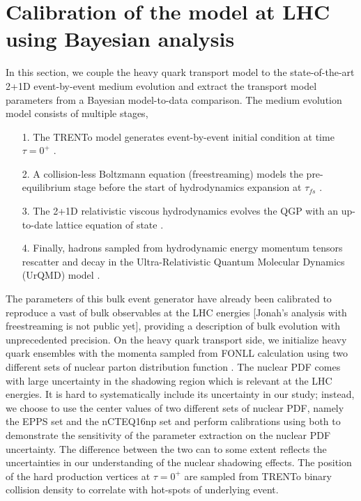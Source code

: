 \documentclass[aps, prc, reprint, amsmath, groupedaddress, nofootinbib]{revtex4-1}
\begin{document}
\section{Calibration of the model at LHC using Bayesian analysis}\label{section:calibration}
In this section, we couple the heavy quark transport model to the state-of-the-art 2+1D event-by-event medium evolution and extract the transport model parameters from a Bayesian model-to-data comparison.
The medium evolution model consists of multiple stages,
\begin{itemize}
\item[1.] The TRENTo model generates event-by-event initial condition at time $\tau = 0^+$ \cite{Moreland:2014oya}. 
\item[2.] A collision-less Boltzmann equation (freestreaming) models the pre-equilibrium stage before the start of hydrodynamics expansion at $\tau_{fs}$ \cite{Liu:2015nwa}.
\item[3.] The 2+1D relativistic viscous hydrodynamics evolves the QGP with an up-to-date lattice equation of state \cite{Shen:2014vra, Bazavov:2014pvz}.
\item[4.] Finally, hadrons sampled from hydrodynamic energy momentum tensors rescatter and decay in the Ultra-Relativistic Quantum Molecular Dynamics (UrQMD) model \cite{Bass:1998ca, Bleicher:1999xi}.
\end{itemize}
The parameters of this bulk event generator have already been calibrated to reproduce a vast of bulk observables at the LHC energies [Jonah's analysis with freestreaming is not public yet], providing a description of bulk evolution with unprecedented precision.
On the heavy quark transport side, we initialize heavy quark ensembles with the momenta sampled from FONLL calculation using two different sets of nuclear parton distribution function \cite{Cacciari:1998it,Kovarik:2015cma,Eskola:2016oht}. 
The nuclear PDF comes with large uncertainty in the shadowing region which is relevant at the LHC energies.
It is hard to systematically include its uncertainty in our study; instead, we choose to use the center values of two different sets of nuclear PDF, namely the EPPS set and the nCTEQ16np set and perform calibrations using both to demonstrate the sensitivity of the parameter extraction on the nuclear PDF uncertainty.
The difference between the two can to some extent reflects the uncertainties in our understanding of the nuclear shadowing effects.
The position of the hard production vertices at $\tau = 0^+$ are sampled from TRENTo binary collision density to correlate with hot-spots of  underlying event. 
\end{document}
